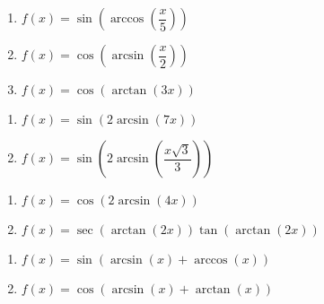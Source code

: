 \begin{multicols}{3}

\begin{enumerate}

\setcounter{enumi}{\value{HW}}

\item  $f(x) = \sin\left(\arccos\left(\dfrac{x}{5}\right)\right)$
\item $f(x) = \cos\left(\arcsin\left(\dfrac{x}{2}\right)\right)$
\item  $f(x) = \cos\left(\arctan\left(3x\right)\right)$ 

\setcounter{HW}{\value{enumi}}

\end{enumerate}

\end{multicols}

\begin{multicols}{2}

\begin{enumerate}

\setcounter{enumi}{\value{HW}}

\item $f(x) = \sin(2\arcsin(7x))$ 
\item  $f(x) = \sin\left(2 \arcsin\left( \dfrac{x\sqrt{3}}{3} \right) \right)$

\setcounter{HW}{\value{enumi}}

\end{enumerate}

\end{multicols}

\begin{multicols}{2}

\begin{enumerate}

\setcounter{enumi}{\value{HW}}

\item $f(x) = \cos(2 \arcsin(4x))$
\item$f(x) = \sec(\arctan(2x))\tan(\arctan(2x))$

\setcounter{HW}{\value{enumi}}

\end{enumerate}

\end{multicols}

\begin{multicols}{2}

\begin{enumerate}

\setcounter{enumi}{\value{HW}}

\item $f(x) = \sin \left( \arcsin(x) + \arccos(x) \right)$ 
\item $f(x) = \cos \left( \arcsin(x) + \arctan(x) \right)$ 

\setcounter{HW}{\value{enumi}}

\end{enumerate}

\end{multicols}

